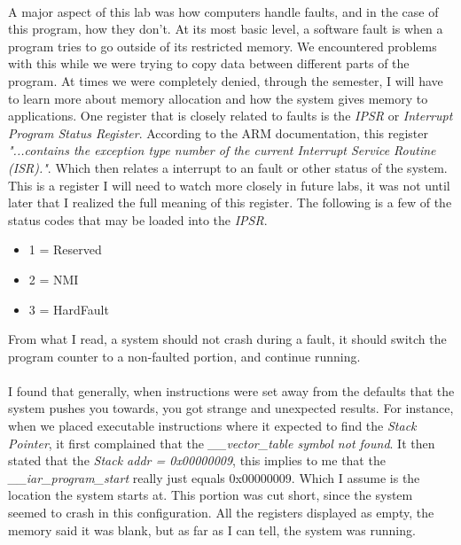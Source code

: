 \documentclass[12pt,a4paper,notitlepage]{report}
\begin{document}
\begin{normalsize}
	\paragraph*{} 
	A major aspect of this lab was how computers handle faults, and in the case of this program, how they don't. At its most basic level, a software fault is when a program tries to go outside of its restricted memory. We encountered problems with this while we were trying to copy data between different parts of the program. At times we were completely denied, through the semester, I will have to learn more about memory allocation and how the system gives memory to applications. One register that is closely related to faults is the \emph{IPSR} or \emph{Interrupt Program Status Register}. According to the ARM documentation, this register \emph{"...contains the exception type number of the current Interrupt Service Routine (ISR)."}. Which then relates a interrupt to an fault or other status of the system. This is a register I will need to watch more closely in future labs, it was not until later that I realized the full meaning of this register. The following is a few of the status codes that may be loaded into the \emph{IPSR}.
\begin{itemize}
  \item 1 = Reserved
  \item 2 = NMI
  \item 3 = HardFault
\end{itemize}
From what I read, a system should not crash during a fault, it should switch the program counter to a non-faulted portion, and continue running. 

\paragraph*{}
I found that generally, when instructions were set away from the defaults that the system pushes you towards, you got strange and unexpected results. For instance, when we placed executable instructions where it expected to find the \emph{Stack Pointer}, it first complained that the \emph{\_\_vector\_table symbol not found}. It then stated that the \emph{Stack addr = 0x00000009}, this implies to me that the \emph{\_\_iar\_program\_start} really just equals 0x00000009. Which I assume is the location the system starts at. This portion was cut short, since the system seemed to crash in this configuration. All the registers displayed as empty, the memory said it was blank, but as far as I can tell, the system was running. 


\end{normalsize}
\end{document}
